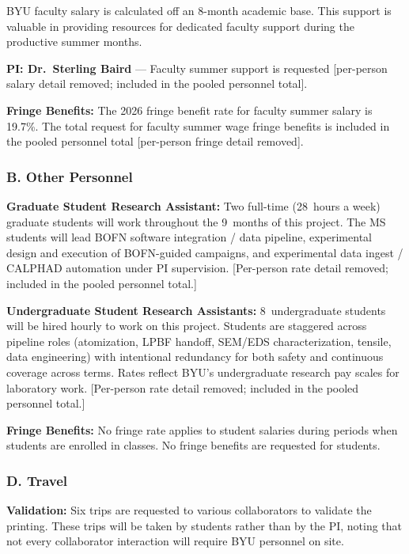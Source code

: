 \documentclass[11pt,letterpaper]{article}
\begin{document}
BYU faculty salary is calculated off an 8-month academic base. This
support is valuable in providing resources for dedicated faculty
support during the productive summer months.

\textbf{PI: Dr.\ Sterling Baird} --- Faculty summer support is requested
[per-person salary detail removed; included in the pooled personnel total].

\textbf{Fringe Benefits:} The 2026 fringe benefit rate for faculty
summer salary is 19.7\%. The total request for faculty summer wage
fringe benefits is included in the pooled personnel total [per-person fringe detail removed].

\subsubsection*{B. Other Personnel}

\textbf{Graduate Student Research Assistant:} Two full-time
(28~hours a week) graduate students will work throughout the
9~months of this project. The MS students will lead BOFN software
integration / data pipeline, experimental design and execution of
BOFN-guided campaigns, and experimental data ingest / CALPHAD
automation under PI supervision. [Per-person rate detail removed; included in the pooled personnel total.]

\textbf{Undergraduate Student Research Assistants:} 8~undergraduate
students will be hired hourly to work on this project. Students are
staggered across pipeline roles (atomization, LPBF handoff, SEM/EDS
characterization, tensile, data engineering) with intentional
redundancy for both safety and continuous coverage across terms.
Rates reflect BYU's undergraduate research pay scales for laboratory
work. [Per-person rate detail removed; included in the pooled personnel total.]

\textbf{Fringe Benefits:} No fringe rate applies to student salaries
during periods when students are enrolled in classes. No fringe
benefits are requested for students.

\subsubsection*{D. Travel}

\textbf{Validation:} Six trips are requested to various
collaborators to validate the printing. These trips will be taken
by students rather than by the PI, noting that not every
collaborator interaction will require BYU personnel on site.
\end{document}
